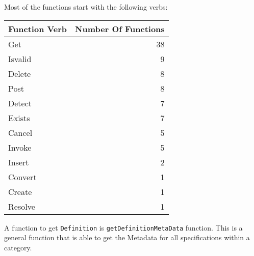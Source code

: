 \documentclass[
]{article}
\begin{document}
Most of the functions start with the following verbs:

\begin{longtable}[]{@{}lr@{}}
\toprule
Function Verb & Number Of Functions\tabularnewline
\midrule
\endhead
Get & 38\tabularnewline
Isvalid & 9\tabularnewline
Delete & 8\tabularnewline
Post & 8\tabularnewline
Detect & 7\tabularnewline
Exists & 7\tabularnewline
Cancel & 5\tabularnewline
Invoke & 5\tabularnewline
Insert & 2\tabularnewline
Convert & 1\tabularnewline
Create & 1\tabularnewline
Resolve & 1\tabularnewline
\bottomrule
\end{longtable}

A function to get \texttt{Definition} is \texttt{getDefinitionMetaData}
function. This is a general function that is able to get the Metadata
for all specifications within a category.
\end{document}
